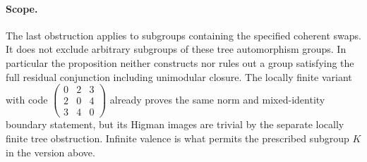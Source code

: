 \paragraph{Scope.}
The last obstruction applies to subgroups containing the specified
coherent swaps.  It does not exclude arbitrary subgroups of these
tree automorphism groups.  In particular the proposition neither
constructs nor rules out a group satisfying the full residual
conjunction including unimodular closure.  The locally finite variant
with code
$\left(\begin{smallmatrix}0&2&3\\2&0&4\\3&4&0\end{smallmatrix}\right)$
already proves the same norm and mixed-identity boundary statement,
but its Higman images are trivial by the separate locally finite
tree obstruction.  Infinite valence is what permits the prescribed
subgroup $K$ in the version above.
